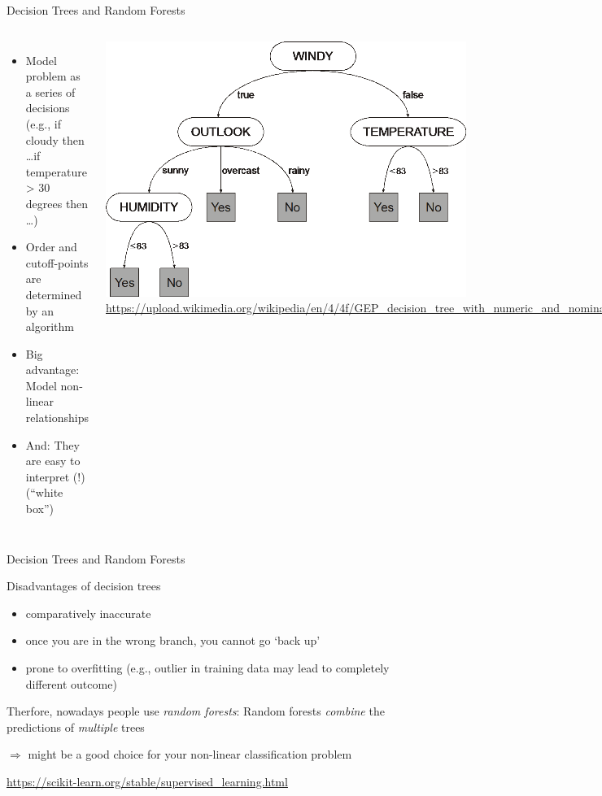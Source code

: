 \documentclass{beamer}
\begin{document}
\begin{frame}{Decision Trees and Random Forests}

\begin{columns}
\begin{itemize}[<+->]
\item Model problem as a series of decisions (e.g., if cloudy then \ldots if temperature > 30 degrees then \ldots)
\item Order and cutoff-points are determined by an algorithm
\item Big advantage: Model non-linear relationships
\item And: They are easy to interpret (!) (``white box'')
\end{itemize}

\includegraphics[width=.8\linewidth,height=.5\paperheight,keepaspectratio]{../pictures/decisiontree}
\tiny{\url{https://upload.wikimedia.org/wikipedia/en/4/4f/GEP\_decision\_tree\_with\_numeric\_and\_nominal\_attributes.png}}

\end{columns}

\end{frame}



\begin{frame}{Decision Trees and Random Forests}

\begin{block}{Disadvantages of decision trees}
\begin{itemize}
\item comparatively inaccurate
\item once you are in the wrong branch, you cannot go `back up'
\item prone to overfitting (e.g., outlier in training data may lead to completely different outcome)
\end{itemize}
\end{block}

\pause

Therfore, nowadays people use \emph{random forests}: Random forests \emph{combine} the predictions of \emph{multiple} trees

$\Rightarrow$ might be a good choice for your non-linear classification problem

\end{frame}

\begin{frame}
\large{\url{https://scikit-learn.org/stable/supervised_learning.html}}
\end{frame}
\end{document}
